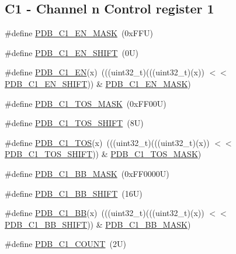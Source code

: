 \subsection*{C1 -\/ Channel n Control register 1}
\begin{DoxyCompactItemize}
\item 
\#define \mbox{\hyperlink{group___p_d_b___register___masks_ga318b4eb1bb609120bed14b19c91ef0c1}{P\+D\+B\+\_\+\+C1\+\_\+\+E\+N\+\_\+\+M\+A\+SK}}~(0x\+F\+F\+U)
\item 
\#define \mbox{\hyperlink{group___p_d_b___register___masks_ga99bd07d734f0e46a718933179b61402b}{P\+D\+B\+\_\+\+C1\+\_\+\+E\+N\+\_\+\+S\+H\+I\+FT}}~(0\+U)
\item 
\#define \mbox{\hyperlink{group___p_d_b___register___masks_gab2ca4b13b2a865c68c2e1505f4b4f13b}{P\+D\+B\+\_\+\+C1\+\_\+\+EN}}(x)~(((uint32\+\_\+t)(((uint32\+\_\+t)(x)) $<$$<$ \mbox{\hyperlink{group___p_d_b___register___masks_ga99bd07d734f0e46a718933179b61402b}{P\+D\+B\+\_\+\+C1\+\_\+\+E\+N\+\_\+\+S\+H\+I\+FT}})) \& \mbox{\hyperlink{group___p_d_b___register___masks_ga318b4eb1bb609120bed14b19c91ef0c1}{P\+D\+B\+\_\+\+C1\+\_\+\+E\+N\+\_\+\+M\+A\+SK}})
\item 
\#define \mbox{\hyperlink{group___p_d_b___register___masks_gabc4c3ddddcd8ab8629495457629a560e}{P\+D\+B\+\_\+\+C1\+\_\+\+T\+O\+S\+\_\+\+M\+A\+SK}}~(0x\+F\+F00\+U)
\item 
\#define \mbox{\hyperlink{group___p_d_b___register___masks_ga5f76b81da95cec6cc1dcbd761e48d32f}{P\+D\+B\+\_\+\+C1\+\_\+\+T\+O\+S\+\_\+\+S\+H\+I\+FT}}~(8\+U)
\item 
\#define \mbox{\hyperlink{group___p_d_b___register___masks_gae5c193c9c001f33a49f1ae3c2a11133c}{P\+D\+B\+\_\+\+C1\+\_\+\+T\+OS}}(x)~(((uint32\+\_\+t)(((uint32\+\_\+t)(x)) $<$$<$ \mbox{\hyperlink{group___p_d_b___register___masks_ga5f76b81da95cec6cc1dcbd761e48d32f}{P\+D\+B\+\_\+\+C1\+\_\+\+T\+O\+S\+\_\+\+S\+H\+I\+FT}})) \& \mbox{\hyperlink{group___p_d_b___register___masks_gabc4c3ddddcd8ab8629495457629a560e}{P\+D\+B\+\_\+\+C1\+\_\+\+T\+O\+S\+\_\+\+M\+A\+SK}})
\item 
\#define \mbox{\hyperlink{group___p_d_b___register___masks_ga4e6f86caa6df500cedef06d1638194ca}{P\+D\+B\+\_\+\+C1\+\_\+\+B\+B\+\_\+\+M\+A\+SK}}~(0x\+F\+F0000\+U)
\item 
\#define \mbox{\hyperlink{group___p_d_b___register___masks_gadd4b49047fcd1a75374752c012a931d8}{P\+D\+B\+\_\+\+C1\+\_\+\+B\+B\+\_\+\+S\+H\+I\+FT}}~(16\+U)
\item 
\#define \mbox{\hyperlink{group___p_d_b___register___masks_ga5e17c540740d6900e1a1184dd0c21e69}{P\+D\+B\+\_\+\+C1\+\_\+\+BB}}(x)~(((uint32\+\_\+t)(((uint32\+\_\+t)(x)) $<$$<$ \mbox{\hyperlink{group___p_d_b___register___masks_gadd4b49047fcd1a75374752c012a931d8}{P\+D\+B\+\_\+\+C1\+\_\+\+B\+B\+\_\+\+S\+H\+I\+FT}})) \& \mbox{\hyperlink{group___p_d_b___register___masks_ga4e6f86caa6df500cedef06d1638194ca}{P\+D\+B\+\_\+\+C1\+\_\+\+B\+B\+\_\+\+M\+A\+SK}})
\item 
\#define \mbox{\hyperlink{group___p_d_b___register___masks_ga5136a593c75d4dcf64f5e58762884c72}{P\+D\+B\+\_\+\+C1\+\_\+\+C\+O\+U\+NT}}~(2\+U)
\end{DoxyCompactItemize}
